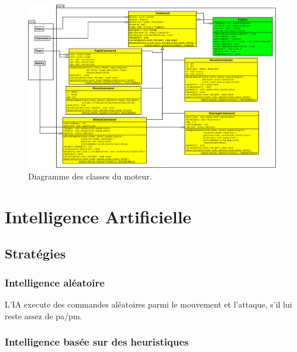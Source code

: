 \documentclass[a4paper,12pt]{article}
\begin{document}
\begin{landscape}
    \begin{figure}[p]
        \centering
        \includegraphics[width=0.9\paperheight,keepaspectratio]{engine.png}
        \caption{\label{uml:engine}Diagramme des classes du moteur.}
    \end{figure}
\end{landscape}

\clearpage
\section{Intelligence Artificielle}

\subsection{Stratégies}
\subsubsection{Intelligence aléatoire}

L'IA execute des commandes aléatoires parmi le mouvement et l'attaque, s'il lui reste assez de pa/pm.

\subsubsection{Intelligence basée sur des heuristiques}
\end{document}

